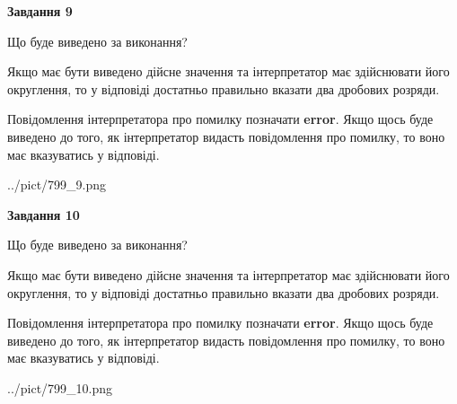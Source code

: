 \documentclass[12pt, ukrainian]{article}
\begin{document}
{\begin {Large}
{\begin {center}\textbf{Завдання 9}\end {center}}\par
Що буде виведено за виконання? \par

Якщо має бути виведено дійсне значення та інтерпретатор має здійснювати його округлення, 
то у відповіді достатньо правильно вказати два дробових розряди.

Повідомлення інтерпретатора про помилку позначати \textbf{error}.
Якщо щось буде виведено до того, як інтерпретатор видасть повідомлення про помилку, 
то воно має вказуватись у відповіді. \par

\begin{center}
	{../pict/799_9.png}
\end{center}
\newpage

{\begin {center}\textbf{Завдання 10}\end {center}}\par
Що буде виведено за виконання? \par

Якщо має бути виведено дійсне значення та інтерпретатор має здійснювати його округлення, 
то у відповіді достатньо правильно вказати два дробових розряди.

Повідомлення інтерпретатора про помилку позначати \textbf{error}.
Якщо щось буде виведено до того, як інтерпретатор видасть повідомлення про помилку, 
то воно має вказуватись у відповіді. \par

\begin{center}
	{../pict/799_10.png}
\end{center}
\newpage

\end {Large}}
\end{document}
